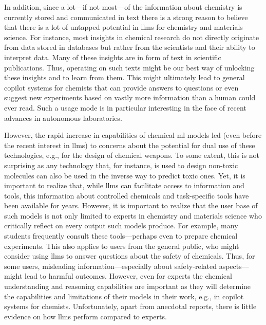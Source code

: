 \documentclass[11pt, oneside]{article}
\begin{document}
\begin{refsection}
In addition, since a lot---if not most---of the information about chemistry is currently stored and communicated in text there is a strong reason to believe that there is a lot of untapped potential in \glspl{llm} for chemistry and materials science.
For instance, most insights in chemical research do not directly originate from data stored in databases but rather from the scientists and their ability to interpret data. 
Many of these insights are in form of text in scientific publications. 
Thus, operating on such texts might be our best way of unlocking these insights and to learn from them.
This might ultimately lead to general copilot systems for chemists that can provide answers to questions or even suggest new experiments based on vastly more information than a human could ever read.
Such a usage mode is in particular interesting in the face of recent advances in autonomous laboratories.\autocite{Boiko_2023, bran2023chemcrow, darvish2024organa, granda2018controlling, Angello_2022, coley2019robotic, Burger_2020, seifrid2022autonomous}


However, the rapid increase in capabilities of chemical \gls{ml} models led (even before the recent interest in \glspl{llm}) to concerns about the potential for dual use of these technologies, e.g., for the design of chemical weapons.\autocite{gopal2023releasing, ganguli2022red, Urbina_2022, campbell2023censoring, moulange2023towards, urbina2022teachable}
To some extent, this is not surprising as any technology that, for instance, is used to design non-toxic molecules can also be used in the inverse way to predict toxic ones. Yet, it is important to realize that, while \glspl{llm} can facilitate access to information and tools, this information about controlled chemicals and task-specific tools have been available for years.
However, it is important to realize that the user base of such models is not only limited to experts in chemistry and materials science who critically reflect on every output such models produce. 
For example, many students frequently consult these tools---perhaps even to prepare chemical experiments.\autocite{Intelligent.com_2023}
This also applies to users from the general public, who might consider using \glspl{llm} to answer questions about the safety of chemicals.
Thus, for some users, misleading information---especially about safety-related aspects---might lead to harmful outcomes. 
However, even for experts the chemical understanding and reasoning capabilities are important as they will determine the capabilities and limitations of their models in their work, e.g., in copilot systems for chemists.
Unfortunately, apart from anecdotal reports, there is little evidence on how \glspl{llm} perform compared to experts.


\end{refsection}
\end{document}
